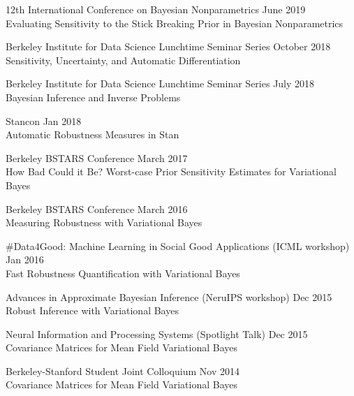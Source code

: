 \documentclass[margin,line]{res}
\begin{document}
\begin{resume}

12th International Conference on Bayesian Nonparametrics \hfill June 2019\\
Evaluating Sensitivity to the Stick Breaking Prior in Bayesian Nonparametrics



Berkeley Institute for Data Science Lunchtime Seminar Series \hfill October 2018\\
Sensitivity, Uncertainty, and Automatic Differentiation

Berkeley Institute for Data Science Lunchtime Seminar Series \hfill July 2018\\
Bayesian Inference and Inverse Problems

Stancon \hfill Jan 2018\\
Automatic Robustness Measures in Stan


Berkeley BSTARS Conference \hfill March 2017\\
How Bad Could it Be?  Worst-case Prior Sensitivity Estimates for Variational Bayes

Berkeley BSTARS Conference \hfill March 2016\\
Measuring Robustness with Variational Bayes

\#Data4Good: Machine Learning in Social Good Applications (ICML workshop) \hfill Jan 2016\\
Fast Robustness Quantification with Variational Bayes


Advances in Approximate Bayesian Inference (NeruIPS workshop) \hfill Dec 2015\\
Robust Inference with Variational Bayes

Neural Information and Processing Systems (Spotlight Talk) \hfill Dec 2015\\
Covariance Matrices for Mean Field Variational Bayes

Berkeley-Stanford Student Joint Colloquium \hfill Nov 2014\\
Covariance Matrices for Mean Field Variational Bayes


\end{resume}
\end{document}

